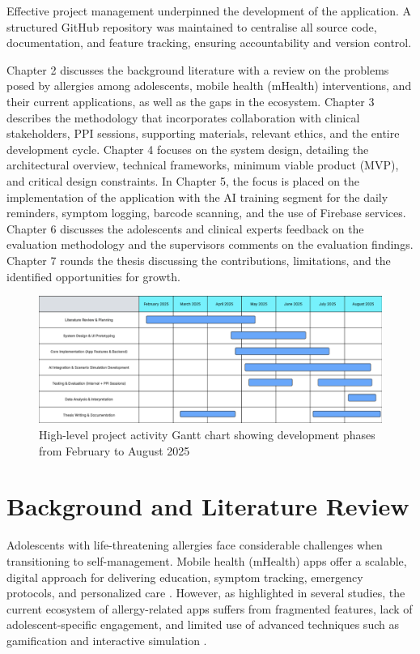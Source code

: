 \documentclass[MScCS]{uccthesis}
\begin{document}
Effective project management underpinned the development of the application. A structured GitHub repository was maintained to centralise all source code, documentation, and feature tracking, ensuring accountability and version control.   


Chapter 2 discusses the background literature with a review on the problems posed by allergies among adolescents, mobile health (mHealth) interventions, and their current applications, as well as the gaps in the ecosystem. Chapter 3 describes the methodology that incorporates collaboration with clinical stakeholders, PPI sessions, supporting materials, relevant ethics, and the entire development cycle. Chapter 4 focuses on the system design, detailing the architectural overview, technical frameworks, minimum viable product (MVP), and critical design constraints. In Chapter 5, the focus is placed on the implementation of the application with the AI training segment for the daily reminders, symptom logging, barcode scanning, and the use of Firebase services. Chapter 6 discusses the adolescents and clinical experts feedback on the evaluation methodology and the supervisors comments on the evaluation findings. Chapter 7 rounds the thesis discussing the contributions, limitations, and the identified opportunities for growth.



\begin{figure}[htbp]
    \centering
    \includegraphics[width=\textwidth]{Figures/gantt_chart.png}
    \caption{High-level project activity Gantt chart showing development phases from February to August 2025}
    \label{fig:gantt}
\end{figure}

\clearpage
 

\chapter{Background and Literature Review}


Adolescents with life-threatening allergies face considerable challenges when transitioning to self-management. Mobile health (mHealth) apps offer a scalable, digital approach for delivering education, symptom tracking, emergency protocols, and personalized care \cite{matricardi2020mhealth, sullivan2024telehealth}. However, as highlighted in several studies, the current ecosystem of allergy-related apps suffers from fragmented features, lack of adolescent-specific engagement, and limited use of advanced techniques such as gamification and interactive simulation \cite{virella2019mobile, majeed2015apps, macmath2023ai, gajardo2023gamification}.  
\end{document}
